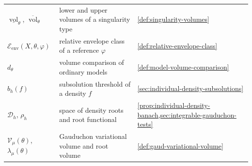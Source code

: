 \begin{center}
\begin{tabular}{@{}>{\raggedright\arraybackslash}p{}>{\raggedright\arraybackslash}p{}>{\raggedright\arraybackslash}p{}@{}}
$\underline{\operatorname{vol}}_\theta$, $\overline{\operatorname{vol}}_\theta$ & lower and upper volumes of a singularity type & \cref{def:singularity-volumes}\\
$\mathcal E_{\mathrm{env}}(X,\theta,\varphi)$ & relative envelope class of a reference $\varphi$ & \cref{def:relative-envelope-class}\\
$d_\theta$ & volume comparison of ordinary models & \cref{def:model-volume-comparison}\\
$b_h(f)$ & subsolution threshold of a density $f$ & \cref{sec:individual-density-subsolutions}\\
$\mathcal D_h$, $\rho_h$ & space of density roots and root functional & \cref{prop:individual-density-banach,sec:integrable-gauduchon-tests}\\
$\mathcal V_\mu(\theta)$, $\lambda_\mu(\theta)$ & Gauduchon variational volume and root volume & \cref{def:gaud-variational-volume}\\
\bottomrule
\end{tabular}
\end{center}
